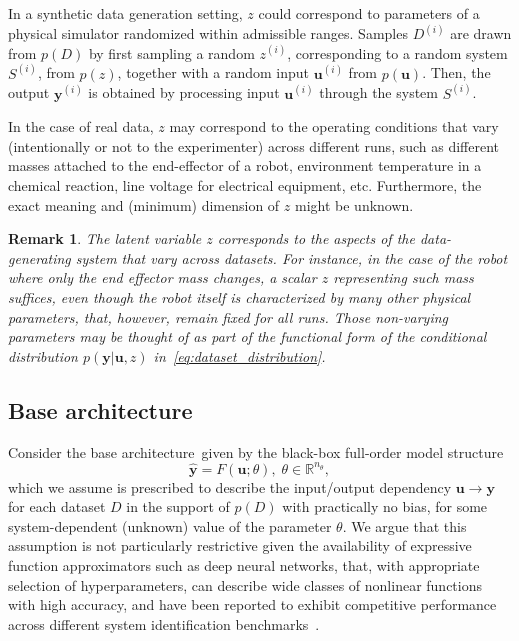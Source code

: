 \documentclass{article}
\newcommand{\base}{{base architecture}}
\newcommand{\ii}{{(i)}}
\newcommand{\seq}[1]{{\mathbf{#1}}}
\newcommand{\R}{\mathbb{R}}
\newcommand{\D}{D}
\newcommand{\sys}{S}
\newcommand{\latent}{z}
\newcommand{\fullpar}{\theta}
\newtheorem{remark}{Remark}%
\begin{document}
In a synthetic data generation setting, $z$ could correspond to parameters of a physical simulator randomized within admissible ranges. 
Samples $\D^\ii$ are drawn from $p(\D)$ by first sampling a random $\latent^\ii$, corresponding to a random system $\sys^\ii$, from $p(\latent)$, together with a random input $\seq{u}^\ii$ from $p(\seq u)$. Then, the output $\seq{y}^\ii$ is obtained by processing input  $\seq{u}^\ii$ through the system $\sys^\ii$. 

In the case of real data, $z$ may correspond to the operating conditions that vary (intentionally or not to the experimenter) across different 
 runs, such as different masses attached to the end-effector of a robot, environment temperature in a chemical reaction, line voltage for electrical equipment, etc.
Furthermore, the exact meaning and (minimum) dimension of $\latent$ might be unknown.


\begin{remark}
The latent variable $\latent$ corresponds to the aspects of the data-generating system that vary across datasets.
For instance, in the case of the robot where only the end effector mass changes, a scalar $\latent$ representing such mass suffices, even though the robot itself is characterized by many other physical parameters, that, however, remain fixed for all runs. Those non-varying parameters may be thought of as part of the functional form of the conditional distribution $p(\seq{y} | \seq{u}, z)$ in~\eqref{eq:dataset_distribution}.
\end{remark}

\subsection{Base architecture}
\label{sec:full_order}
Consider the \base\ given by the black-box full-order model structure
\begin{equation}
\label{eq:fullnet}
\hat {\seq{y}} = F(\seq{u}; \fullpar),\;  \fullpar \in \R^{n_\fullpar},
\end{equation}
which we assume is prescribed to describe the input/output dependency $\seq u \rightarrow \seq y$ for each dataset $\D$ in the support of $p(\D)$ with practically no bias, for some system-dependent (unknown) value of the parameter $\theta$. 
We argue that this assumption is not particularly restrictive given the availability of expressive function approximators such as deep neural networks, that, with appropriate selection of hyperparameters, can describe wide classes of nonlinear functions with high accuracy, and have been reported to exhibit competitive performance across different system identification benchmarks~\cite{champneys2024baseline}.
\end{document}
